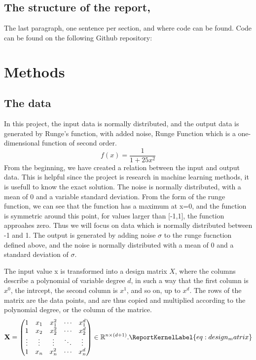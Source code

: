 \documentclass[aps,rmp,reprint,amsmath,amssymb,longbibliography]{revtex4-1}
\let\label\ReportKernelLabel
\begin{document}
\subsection{The structure of the report,}
The last paragraph, one sentence per section, and where code can be found.
Code can be found on the following Github repository: \cite{Timholmen96FYSSTK4155Prosjektarbeid}

\section{Methods}
\subsection{The data}
In this project, the input data is normally distributed, and the output data is generated by Runge's function, with added noise,
Runge Function which is a one-dimensional function of second order.
\[
  f(x) = \frac{1}{1 + 25x^2}
\]
From the beginning, we have created a relation between the input and output data. This is helpful since the project is research in machine learning methods, it is usefull to know the exact solution.
The noise is normally distributed, with a mean of 0 and a variable standard deviation.
From the form of the runge function, we can see that the function has a maximum at x=0, and the function is symmetric around this point,
for values larger than [-1,1], the function approahes zero.
Thus we will focus on data which is normally distributed between -1 and 1.
The output is generated by adding noise $\sigma$ to the runge fucnction defined above, and the noise is normally distributed with a mean of 0 and a standard deviation of $\sigma$.

The input value x is transformed into a design matrix $X$,
where the columns describe a polynomial of variable degree $d$,
in such a way that the first column is $x^0$, the intrcept, the second column is $x^1$, and so on, up to $x^{d}$.
The rows of the matrix are the data points, and are thus copied and multiplied according to the polynomial degree, or the column of the matrice.
\begin{equation}
\mathbf{X} =
\begin{pmatrix}
1 & x_1 & x_1^2 & \cdots & x_1^d \\
1 & x_2 & x_2^2 & \cdots & x_2^d \\
\vdots & \vdots & \vdots & \ddots & \vdots \\
1 & x_n & x_n^2 & \cdots & x_n^d
\end{pmatrix}
\in \mathbb{R}^{n \times (d+1)}.
\label{eq:design_matrix}
\end{equation}
\end{document}
